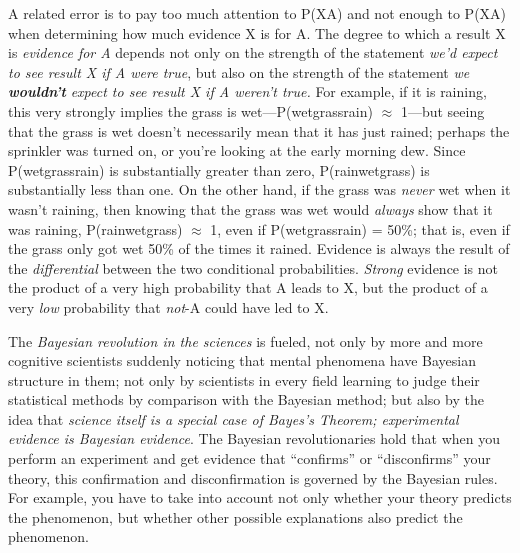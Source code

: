 {
 A related error is to pay too much attention to P(X{\textbar}A)
and not enough to P(X{\textbar}{\textlnot}A) when determining how much
evidence X is for A. The degree to which a result X is \textit{evidence
for A} depends not only on the strength of the statement
\textit{we'd expect to see result X if A were true},
but also on the strength of the statement \textit{we
}\textbf{\textit{wouldn't}}\textit{ expect to see
result X if A weren't true.} For example, if it is
raining, this very strongly implies the grass is
wet---P(wetgrass{\textbar}rain) ${\approx}$ 1---but seeing that the
grass is wet doesn't necessarily mean that it has just
rained; perhaps the sprinkler was turned on, or you're
looking at the early morning dew. Since
P(wetgrass{\textbar}{\textlnot}rain) is substantially greater than
zero, P(rain{\textbar}wetgrass) is substantially less than one. On the
other hand, if the grass was \textit{never} wet when it
wasn't raining, then knowing that the grass was wet
would \textit{always} show that it was raining,
P(rain{\textbar}wetgrass) ${\approx}$ 1, even if
P(wetgrass{\textbar}rain) = 50\%; that is, even if the grass only got
wet 50\% of the times it rained. Evidence is always the result of the
\textit{differential} between the two conditional probabilities.
\textit{Strong} evidence is not the product of a very high probability
that A leads to X, but the product of a very \textit{low} probability
that \textit{not}{}-A could have led to X.}

{
 The \textit{Bayesian revolution in the sciences} is fueled, not
only by more and more cognitive scientists suddenly noticing that
mental phenomena have Bayesian structure in them; not only by
scientists in every field learning to judge their statistical methods
by comparison with the Bayesian method; but also by the idea that
\textit{science itself is a special case of Bayes's
Theorem; experimental evidence is Bayesian evidence}. The Bayesian
revolutionaries hold that when you perform an experiment and get
evidence that ``confirms'' or
``disconfirms'' your theory, this
confirmation and disconfirmation is governed by the Bayesian rules. For
example, you have to take into account not only whether your theory
predicts the phenomenon, but whether other possible explanations also
predict the phenomenon.}

